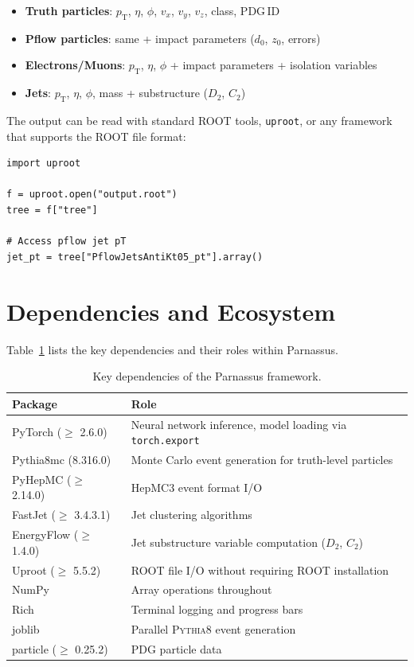 \documentclass[11pt,a4paper]{article}
\begin{document}
\begin{itemize}
  \item \textbf{Truth particles}: $p_\mathrm{T}$, $\eta$, $\phi$, $v_x$, $v_y$, $v_z$,
    class, PDG\,ID
  \item \textbf{Pflow particles}: same + impact parameters ($d_0$, $z_0$, errors)
  \item \textbf{Electrons/Muons}: $p_\mathrm{T}$, $\eta$, $\phi$ + impact parameters
    + isolation variables
  \item \textbf{Jets}: $p_\mathrm{T}$, $\eta$, $\phi$, mass + substructure ($D_2$, $C_2$)
\end{itemize}

\noindent
The output can be read with standard ROOT tools, \texttt{uproot}, or any framework that
supports the ROOT file format:

\begin{lstlisting}[style=python,caption={Reading output with uproot.}]
import uproot

f = uproot.open("output.root")
tree = f["tree"]

# Access pflow jet pT
jet_pt = tree["PflowJetsAntiKt05_pt"].array()
\end{lstlisting}

\section{Dependencies and Ecosystem}
\label{sec:dependencies}

Table~\ref{tab:deps} lists the key dependencies and their roles within Parnassus.

\begin{table}[H]
\centering
\caption{Key dependencies of the Parnassus framework.}
\label{tab:deps}
\begin{tabular}{@{}ll@{}}
\toprule
\textbf{Package} & \textbf{Role} \\
\midrule
PyTorch ($\geq$ 2.6.0)     & Neural network inference, model loading via \texttt{torch.export} \\
Pythia8mc (8.316.0)         & Monte Carlo event generation for truth-level particles \\
PyHepMC ($\geq$ 2.14.0)    & HepMC3 event format I/O \\
FastJet ($\geq$ 3.4.3.1)   & Jet clustering algorithms \\
EnergyFlow ($\geq$ 1.4.0)  & Jet substructure variable computation ($D_2$, $C_2$) \\
Uproot ($\geq$ 5.5.2)      & ROOT file I/O without requiring ROOT installation \\
NumPy                       & Array operations throughout \\
Rich                        & Terminal logging and progress bars \\
joblib                      & Parallel \textsc{Pythia8} event generation \\
particle ($\geq$ 0.25.2)   & PDG particle data \\
\bottomrule
\end{tabular}
\end{table}
\end{document}

